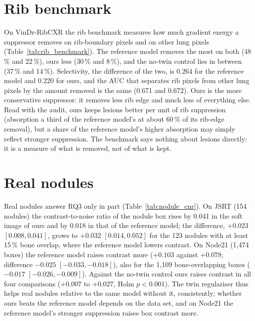 \section{Rib benchmark}
On VinDr-RibCXR the rib benchmark measures how much gradient energy a suppressor removes on rib-boundary pixels and on other lung pixels
(Table~\ref{tab:rib_benchmark}). The reference model removes the most on both (48\,\% and 22\,\%), ours less (30\,\% and 8\,\%), and the
no-twin control lies in between (37\,\% and 14\,\%). Selectivity, the difference of the two, is 0.264 for the reference model and 0.220 for
ours, and the AUC that separates rib pixels from other lung pixels by the amount removed is the same (0.671 and 0.672). Ours is the more
conservative suppressor: it removes less rib edge and much less of everything else. Read with the audit, ours keeps lesions better per unit of
rib suppression (absorption a third of the reference model's at about 60\,\% of its rib-edge removal), but a share of the reference model's
higher absorption may simply reflect stronger suppression. The benchmark says nothing about lesions directly: it is a measure of what is
removed, not of what is kept.
\begin{table}[htbp]
\centering\small
\caption{Rib benchmark on VinDr-RibCXR (metrics only): gradient-energy reduction on rib-boundary pixels and on other lung pixels, selectivity
and AUC.}
\label{tab:rib_benchmark}
\end{table}

\section{Real nodules}
Real nodules answer RQ3 only in part (Table~\ref{tab:nodule_cnr}). On JSRT (154 nodules) the contrast-to-noise ratio of the nodule box rises
by 0.041 in the soft image of ours and by 0.018 in that of the reference model; the difference, $+0.023$ $[0.008,0.041]$, grows to $+0.032$
$[0.014,0.052]$ for the 123 nodules with at least 15\,\% bone overlap, where the reference model lowers contrast. On Node21 (1,474 boxes) the
reference model raises contrast more ($+0.103$ against $+0.078$; difference $-0.025$ $[-0.033,-0.018]$), also for the 1,109 bone-overlapping
boxes ($-0.017$ $[-0.026,-0.009]$). Against the no-twin control ours raises contrast in all four comparisons ($+0.007$ to $+0.027$, Holm
$p<0.001$). The twin regulariser thus helps real nodules relative to the same model without it, consistently; whether ours beats the reference
model depends on the data set, and on Node21 the reference model's stronger suppression raises box contrast more.
\begin{table}[htbp]
\centering\small
\caption{Contrast-to-noise change of real nodules on JSRT and Node21 (soft-tissue image minus original), all lesions and lesions with at least
15\,\% bone overlap; image-cluster bootstrap intervals.}
\label{tab:nodule_cnr}
\end{table}

